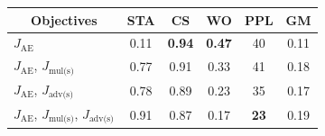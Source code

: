 \documentclass[11pt,a4paper]{article}
\newcommand{\tabc}[2]{\multicolumn{1}{|c||}{\multirow{#1}{*}{\textbf{#2}}}}
\newcommand{\loss}[1]{J_{\text{#1}}}
\begin{document}
\begin{table}[ht]
	\centering\vspace{-.2cm}\small
	\begin{tabular}{| l || c | c | c | c || c |}
		\hline
		\tabc{1}{Objectives}                                                            & \textbf{STA}  & \textbf{CS}   & \textbf{WO}   & \textbf{PPL} & \textbf{GM}   \\
		\hline\hline
		$\loss{AE}$                                                                     & 0.11          & \textbf{0.94} & \textbf{0.47} & 40           & 0.11          \\ \hline
		$\loss{AE}$, $\loss{mul(s)}$                                                    & 0.77          & 0.91          & 0.33          & 41           & 0.18          \\ \hline
		$\loss{AE}$, $\loss{adv(s)}$                                                    & 0.78          & 0.89          & 0.23          & 35           & 0.17          \\ \hline
		$\loss{AE}$, $\loss{mul(s)}$, $\loss{adv(s)}$                                   & 0.91          & 0.87          & 0.17          & \textbf{23}  & 0.19          \\ \hline

\end{tabular}
\end{table}
\end{document}
